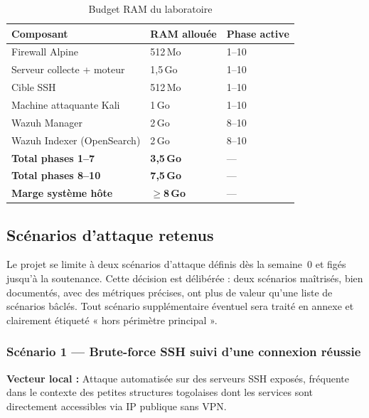 \documentclass[11pt,a4paper]{article}
\begin{document}
\begin{table}[H]
\centering
\caption{Budget RAM du laboratoire}
\small
\begin{tabularx}{\textwidth}{L{5cm} C{2cm} C{2cm}}
\toprule
{}
{\color{white}\textbf{Composant}} &
{\color{white}\textbf{RAM allouée}} &
{\color{white}\textbf{Phase active}} \\
\midrule
Firewall Alpine & 512\,Mo & 1--10 \\
Serveur collecte + moteur & 1,5\,Go & 1--10 \\
Cible SSH & 512\,Mo & 1--10 \\
Machine attaquante Kali & 1\,Go & 1--10 \\
Wazuh Manager & 2\,Go & 8--10 \\
Wazuh Indexer (OpenSearch) & 2\,Go & 8--10 \\
\midrule
\textbf{Total phases 1--7} & \textbf{3,5\,Go} & — \\
\textbf{Total phases 8--10} & \textbf{7,5\,Go} & — \\
\textbf{Marge système hôte} & \textbf{$\geq$8\,Go} & — \\
\bottomrule
\end{tabularx}
\end{table}

\subsection{Scénarios d'attaque retenus}

\begin{infobox}[title={Décision de scope — 2 scénarios uniquement}]
Le projet se limite à deux scénarios d'attaque définis dès la semaine~0
et figés jusqu'à la soutenance.
Cette décision est délibérée : deux scénarios maîtrisés, bien documentés,
avec des métriques précises, ont plus de valeur qu'une liste de scénarios
bâclés. Tout scénario supplémentaire éventuel sera traité en annexe
et clairement étiqueté « hors périmètre principal ».
\end{infobox}

\subsubsection{Scénario 1 — Brute-force SSH suivi d'une connexion réussie}

\textbf{Vecteur local :} Attaque automatisée sur des serveurs SSH exposés,
fréquente dans le contexte des petites structures togolaises dont les
services sont directement accessibles via IP publique sans VPN.
\end{document}

